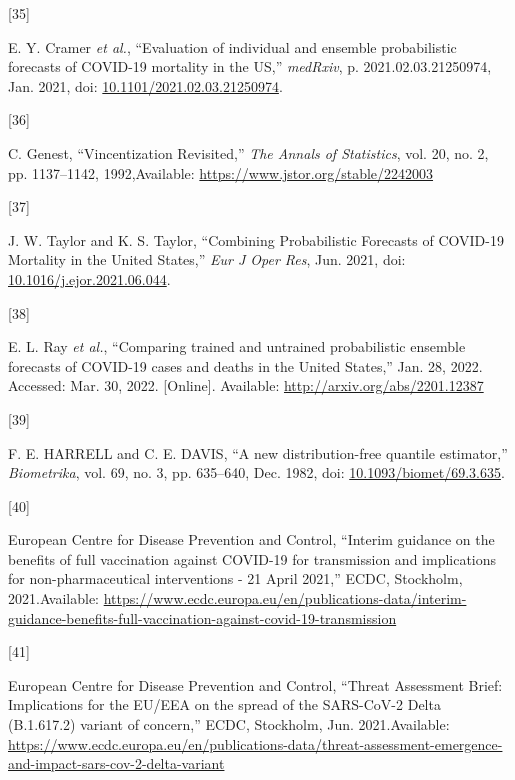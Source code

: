 \documentclass[
]{article}
\newlength{\cslhangindent}
\newlength{\csllabelwidth}
\newlength{\cslentryspacingunit} %
\newenvironment{CSLReferences}[2] %
 {%
  \setlength{\parindent}{0pt}
  \ifodd #1
  \let\oldpar\par
  \def\par{\hangindent=\cslhangindent\oldpar}
  \fi
  \setlength{\parskip}{#2\cslentryspacingunit}
 }%
 {}
\newcommand{\CSLLeftMargin}[1]{\parbox[t]{\csllabelwidth}{#1}}
\newcommand{\CSLRightInline}[1]{\parbox[t]{\linewidth - \csllabelwidth}{#1}\break}
\begin{document}
\begin{CSLReferences}{0}{0}
\leavevmode{}%
\CSLLeftMargin{{[}35{]} }
\CSLRightInline{E. Y. Cramer \emph{et al.}, {``Evaluation of individual and ensemble probabilistic forecasts of {COVID-19} mortality in the {US},''} \emph{medRxiv}, p. 2021.02.03.21250974, Jan. 2021, doi: \href{https://doi.org/10.1101/2021.02.03.21250974}{10.1101/2021.02.03.21250974}.}

\leavevmode{}%
\CSLLeftMargin{{[}36{]} }
\CSLRightInline{C. Genest, {``Vincentization {Revisited},''} \emph{The Annals of Statistics}, vol. 20, no. 2, pp. 1137--1142, 1992,Available: \url{https://www.jstor.org/stable/2242003}}

\leavevmode{}%
\CSLLeftMargin{{[}37{]} }
\CSLRightInline{J. W. Taylor and K. S. Taylor, {``Combining {Probabilistic Forecasts} of {COVID-19 Mortality} in the {United States},''} \emph{Eur J Oper Res}, Jun. 2021, doi: \href{https://doi.org/10.1016/j.ejor.2021.06.044}{10.1016/j.ejor.2021.06.044}.}

\leavevmode{}%
\CSLLeftMargin{{[}38{]} }
\CSLRightInline{E. L. Ray \emph{et al.}, {``Comparing trained and untrained probabilistic ensemble forecasts of {COVID-19} cases and deaths in the {United States},''} Jan. 28, 2022. Accessed: Mar. 30, 2022. {[}Online{]}. Available: \url{http://arxiv.org/abs/2201.12387}}

\leavevmode{}%
\CSLLeftMargin{{[}39{]} }
\CSLRightInline{F. E. HARRELL and C. E. DAVIS, {``A new distribution-free quantile estimator,''} \emph{Biometrika}, vol. 69, no. 3, pp. 635--640, Dec. 1982, doi: \href{https://doi.org/10.1093/biomet/69.3.635}{10.1093/biomet/69.3.635}.}

\leavevmode{}%
\CSLLeftMargin{{[}40{]} }
\CSLRightInline{European Centre for Disease Prevention and Control, {``Interim guidance on the benefits of full vaccination against {COVID-19} for transmission and implications for non-pharmaceutical interventions - 21 {April} 2021,''} {ECDC}, {Stockholm}, 2021.Available: \url{https://www.ecdc.europa.eu/en/publications-data/interim-guidance-benefits-full-vaccination-against-covid-19-transmission}}

\leavevmode{}%
\CSLLeftMargin{{[}41{]} }
\CSLRightInline{European Centre for Disease Prevention and Control, {``Threat {Assessment Brief}: {Implications} for the {EU}/{EEA} on the spread of the {SARS-CoV-2 Delta} ({B}.1.617.2) variant of concern,''} {ECDC}, {Stockholm}, Jun. 2021.Available: \url{https://www.ecdc.europa.eu/en/publications-data/threat-assessment-emergence-and-impact-sars-cov-2-delta-variant}}


\end{CSLReferences}
\end{document}
